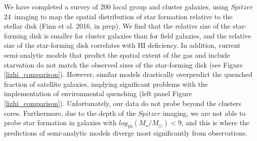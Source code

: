 \documentclass[11pt, preprint]{aastex}
\begin{document}
We have completed a survey of 200 local group and cluster galaxies, using
$Spitzer$ 24\micron \ imaging to map the spatial distribution of star
formation relative to the stellar disk (Finn et al. 2016, in prep).  We find that the relative
size of the star-forming disk is smaller for cluster galaxies than for
field galaxies, and the relative size of the star-forming disk
correlates with HI deficiency.  
In addition, current semi-analytic models that predict the spatial
extent of the gas and include starvation do
not match the observed sizes of the star-forming disk (see Figure \ref{lizhi_comparison}).
However, similar models drastically overpredict the quenched fraction
of satellite galaxies, implying significant problems with the
implementation of environmental quenching (left panel Figure
\ref{lizhi_comparison}).  Unfortunately, our data do not probe beyond
the clusters cores.  Furthermore, due to the depth of the $Spitzer$ imaging, we are not able to probe
star formation in galaxies with $log_{10} (M_\star/M_\odot) < 9$, and
this is where the predictions of semi-analytic models diverge most
significantly from observations.
\end{document}

